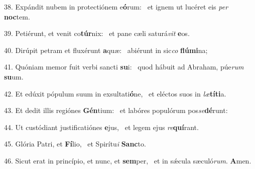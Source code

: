 38. Expándit nubem in protectiónem e\textbf{ó}rum: \ast\  et ignem ut lucéret eis \textit{per} \textbf{noc}tem.\

39. Petiérunt, et venit co\textbf{túr}nix: \ast\  et pane cæli saturá\textit{vit} \textbf{e}os.\

40. Dirúpit petram et fluxérunt \textbf{a}quæ: \ast\  abiérunt in sic\textit{co} \textbf{flú}\textbf{mi}na;\

41. Quóniam memor fuit verbi sancti \textbf{su}i: \ast\  quod hábuit ad Abraham, púe\textit{rum} \textbf{su}um.\

42. Et edúxit pópulum suum in exsultati\textbf{ó}ne, \ast\  et eléctos suos in \textit{læ}\textbf{tí}\textbf{ti}a.\

43. Et dedit illis regiónes \textbf{Gén}tium: \ast\  et labóres populórum pos\textit{se}\textbf{dé}runt:\

44. Ut custódiant justificatiónes \textbf{e}jus, \ast\  et legem ejus \textit{re}\textbf{quí}rant.\

45. Glória Patri, et \textbf{Fí}lio, \ast\  et Spirítu\textit{i} \textbf{Sanc}to.\

46. Sicut erat in princípio, et nunc, et \textbf{sem}per, \ast\  et in sǽcula sæculó\textit{rum}. \textbf{A}men.\

